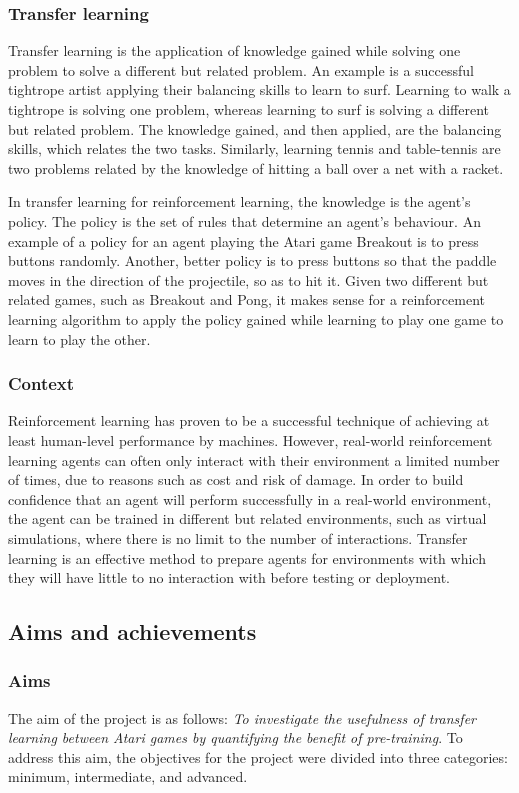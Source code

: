 \documentclass[12pt,a4paper]{article}
\begin{document}
\subsubsection{Transfer learning}
Transfer learning is the application of knowledge gained while solving one problem to solve a different but related problem. An example is a successful tightrope artist applying their balancing skills to learn to surf. Learning to walk a tightrope is solving one problem, whereas learning to surf is solving a different but related problem. The knowledge gained, and then applied, are the balancing skills, which relates the two tasks. Similarly, learning tennis and table-tennis are two problems related by the knowledge of hitting a ball over a net with a racket.  

In transfer learning for reinforcement learning, the knowledge is the agent's policy. The policy is the set of rules that determine an agent's behaviour. An example of a policy for an agent playing the Atari game Breakout is to press buttons randomly. Another, better policy is to press buttons so that the paddle moves in the direction of the projectile, so as to hit it. Given two different but related games, such as Breakout and Pong, it makes sense for a reinforcement learning algorithm to apply the policy gained while learning to play one game to learn to play the other.   

\subsubsection{Context}
Reinforcement learning has proven to be a successful technique of achieving at least human-level performance by machines. However, real-world reinforcement learning agents can often only interact with their environment a limited number of times, due to reasons such as cost and risk of damage. In order to build confidence that an agent will perform successfully in a real-world environment, the agent can be trained in different but related environments, such as virtual simulations, where there is no limit to the number of interactions. Transfer learning is an effective method to prepare agents for environments with which they will have little to no interaction with before testing or deployment. 

\subsection{Aims and achievements}
\subsubsection{Aims}
The aim of the project is as follows: \textit{To investigate the usefulness of transfer learning between Atari games by quantifying the benefit of pre-training}. To address this aim, the objectives for the project were divided into three categories: minimum, intermediate, and advanced. 
\end{document}

